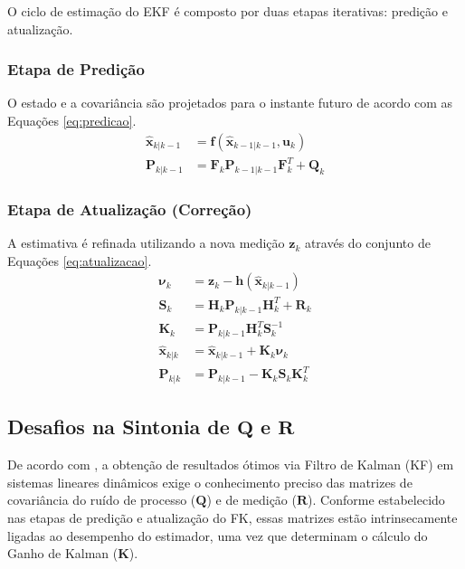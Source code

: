 \documentclass[journal]{IEEEtran}
\begin{document}
O ciclo de estimação do EKF é composto por duas etapas iterativas: predição e atualização.

\subsubsection*{Etapa de Predição}
O estado e a covariância são projetados para o instante futuro de acordo com as Equações \eqref{eq:predicao}.
\begin{align}
    \label{eq:predicao}
    \hat{\mathbf{x}}_{k|k-1} &= \mathbf{f}(\hat{\mathbf{x}}_{k-1|k-1}, \mathbf{u}_k) \nonumber \\
    \mathbf{P}_{k|k-1} &= \mathbf{F}_k \mathbf{P}_{k-1|k-1} \mathbf{F}_k^T + \mathbf{Q}_k
\end{align}

\subsubsection*{Etapa de Atualização (Correção)}
A estimativa é refinada utilizando a nova medição $\mathbf{z}_k$ através do conjunto de Equações \eqref{eq:atualizacao}.
\begin{align}
    \label{eq:atualizacao}
    \mathbf{\nu}_{k} &= \mathbf{z}_k - \mathbf{h}(\hat{\mathbf{x}}_{k|k-1}) \nonumber \\
    \mathbf{S}_{k} &= \mathbf{H}_k \mathbf{P}_{k|k-1} \mathbf{H}_k^T + \mathbf{R}_k \nonumber \\
    \mathbf{K}_k &= \mathbf{P}_{k|k-1} \mathbf{H}_k^T \mathbf{S}_{k}^{-1} \\
    \hat{\mathbf{x}}_{k|k} &= \hat{\mathbf{x}}_{k|k-1} + \mathbf{K}_k \mathbf{\nu}_{k} \nonumber \\
    \mathbf{P}_{k|k} &= \mathbf{P}_{k|k-1} - \mathbf{K}_k \mathbf{S}_{k} \mathbf{K}_k^T \nonumber
\end{align}
\subsection{Desafios na Sintonia de $\mathbf{Q}$ e $\mathbf{R}$}

De acordo com \cite{Mehra1970}, a obtenção de resultados ótimos via Filtro de Kalman (KF) em sistemas lineares dinâmicos exige o conhecimento preciso das matrizes de covariância do ruído de processo ($\mathbf{Q}$) e de medição ($\mathbf{R}$). Conforme estabelecido nas etapas de predição e atualização do FK, essas matrizes estão intrinsecamente ligadas ao desempenho do estimador, uma vez que determinam o cálculo do Ganho de Kalman ($\mathbf{K}$). 
\end{document}

